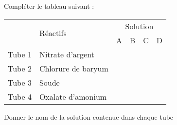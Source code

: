 \documentclass[a4paper,11pt]{exam}
\begin{document}
\begin{questions}


\question
Compléter le tableau suivant :

\begin{tabular}{|@{\ }l@{\ }|@{\ }l@{\ }|l|l|l|l|}
	\hline
	\multirow{2}{*}{} & \multirow{2}{*}{Réactifs} & \multicolumn{4}{c|}{Solution}                                                                     \\ \cline{3-6} 
	&                           & \multicolumn{1}{c|}{A} & \multicolumn{1}{c|}{B} & \multicolumn{1}{c|}{C} & \multicolumn{1}{c|}{D} \\ \hline
	Tube 1            & Nitrate d'argent          &                        &                        &                        &                        \\ \hline
	Tube 2            & Chlorure de baryum        &                        &                        &                        &                        \\ \hline
	Tube 3            & Soude                     &                        &                        &                        &                        \\ \hline
	Tube 4            & Oxalate d'amonium         &                        &                        &                        &                        \\ \hline
\end{tabular}

\vspace*{1cm}

\question Donner le nom de la solution contenue dans chaque tube

\fillwithdottedlines{4cm}


\end{questions}
 \label{LastPage}
 
 
\end{document}
